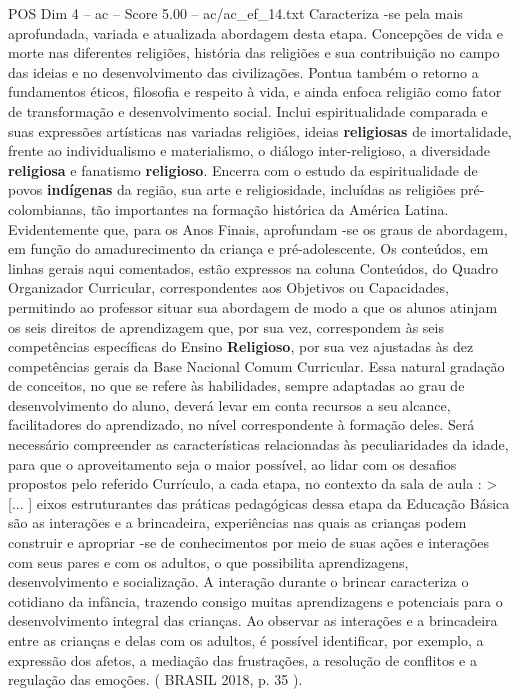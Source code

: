 \begin{textsample}{POS Dim 4 – ac – Score 5.00 – ac/ac\_ef\_14.txt}
Caracteriza -se pela mais aprofundada, variada e atualizada abordagem desta etapa.
Concepções de vida e morte nas diferentes religiões, história das religiões e sua contribuição no campo das ideias e no desenvolvimento das civilizações.
Pontua também o retorno a fundamentos éticos, filosofia e respeito à vida, e ainda enfoca religião como fator de transformação e desenvolvimento social.
Inclui espiritualidade comparada e suas expressões artísticas nas variadas religiões, ideias \textbf{religiosas} de imortalidade, frente ao individualismo e materialismo, o diálogo inter-religioso, a diversidade \textbf{religiosa} e fanatismo \textbf{religioso}.
Encerra com o estudo da espiritualidade de povos \textbf{indígenas} da região, sua arte e religiosidade, incluídas as religiões pré-colombianas, tão importantes na formação histórica da América Latina.
Evidentemente que, para os Anos Finais, aprofundam -se os graus de abordagem, em função do amadurecimento da criança e pré-adolescente.
Os conteúdos, em linhas gerais aqui comentados, estão expressos na coluna Conteúdos, do Quadro Organizador Curricular, correspondentes aos Objetivos ou Capacidades, permitindo ao professor situar sua abordagem de modo a que os alunos atinjam os seis direitos de aprendizagem que, por sua vez, correspondem às seis competências específicas do Ensino \textbf{Religioso}, por sua vez ajustadas às dez competências gerais da Base Nacional Comum Curricular.
Essa natural gradação de conceitos, no que se refere às habilidades, sempre adaptadas ao grau de desenvolvimento do aluno, deverá levar em conta recursos a seu alcance, facilitadores do aprendizado, no nível correspondente à formação deles.
Será necessário compreender as características relacionadas às peculiaridades da idade, para que o aproveitamento seja o maior possível, ao lidar com os desafios propostos pelo referido Currículo, a cada etapa, no contexto da sala de aula : > [... ] eixos estruturantes das práticas pedagógicas dessa etapa da Educação Básica são as interações e a brincadeira, experiências nas quais as crianças podem construir e apropriar -se de conhecimentos por meio de suas ações e interações com seus pares e com os adultos, o que possibilita aprendizagens, desenvolvimento e socialização.
A interação durante o brincar caracteriza o cotidiano da infância, trazendo consigo muitas aprendizagens e potenciais para o desenvolvimento integral das crianças.
Ao observar as interações e a brincadeira entre as crianças e delas com os adultos, é possível identificar, por exemplo, a expressão dos afetos, a mediação das frustrações, a resolução de conflitos e a regulação das emoções. ( BRASIL 2018, p. 35 ).

\end{textsample}
